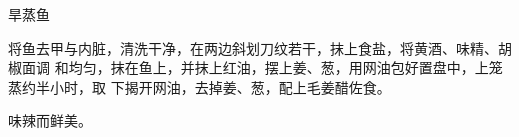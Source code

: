\begin{recipe}{旱蒸鱼}

\ingredients


\preparation

将鱼去甲与内脏，清洗干净，在两边斜划刀纹若干，抹上食盐，将黄酒、味精、胡椒面调
和均匀，抹在鱼上，并抹上红油，摆上姜、葱，用网油包好置盘中，上笼蒸约半小时，取
下揭开网油，去掉姜、葱，配上毛姜醋佐食。

\features

味辣而鲜美。

\end{recipe}

